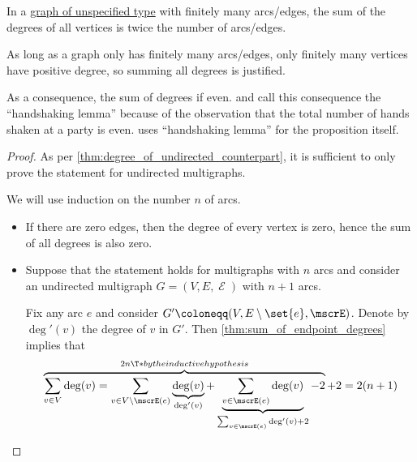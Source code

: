 \begin{proposition}\label{thm:sum_of_graph_degrees}
  In a \hyperref[rem:graph_of_unspecified_type]{graph of unspecified type} with finitely many arcs/edges, the sum of the degrees of all vertices is twice the number of arcs/edges.
\end{proposition}
\begin{comments}
  \item As long as a graph only has finitely many arcs/edges, only finitely many vertices have positive degree, so summing all degrees is justified.
  \item As a consequence, the sum of degrees if even. \Textcite[4]{Bollobás1998ModernGraphTheory} and \textcite[prop. 5.1]{ЕмеличевИПр1990ТеорияГрафов} call this consequence the \enquote{handshaking lemma} because of the observation that the total number of hands shaken at a party is even. \Textcite[thm 10.2.1]{Rosen2019DiscreteMathematics} uses \enquote{handshaking lemma} for the proposition itself.
\end{comments}
\begin{proof}
  As per \cref{thm:degree_of_undirected_counterpart}, it is sufficient to only prove the statement for undirected multigraphs.

  We will use induction on the number \( n \) of arcs.

  \begin{itemize}
    \item If there are zero edges, then the degree of every vertex is zero, hence the sum of all degrees is also zero.

    \item Suppose that the statement holds for multigraphs with \( n \) arcs and consider an undirected multigraph \( G = (V, E, \mscrE) \) with \( n + 1 \) arcs.

    Fix any arc \( e \) and consider \( G' \coloneqq (V, E \setminus \set{ e }, \mscrE) \). Denote by \( \deg'(v) \) the degree of \( v \) in \( G' \). Then \cref{thm:sum_of_endpoint_degrees} implies that
    \begin{equation*}
      \overbrace{\sum_{v \in V} \deg(v) = \sum_{v \in V \setminus \mscrE(e)} \underbrace{\deg(v)}_{\deg'(v)} + \underbrace{\sum_{v \in \mscrE(e)} \deg(v)}_{\sum_{v \in \mscrE(e)} \deg'(v) + 2} - 2}^{2n \T*{by the inductive hypothesis}} + 2
      =
      2(n + 1)
    \end{equation*}
  \end{itemize}
\end{proof}

